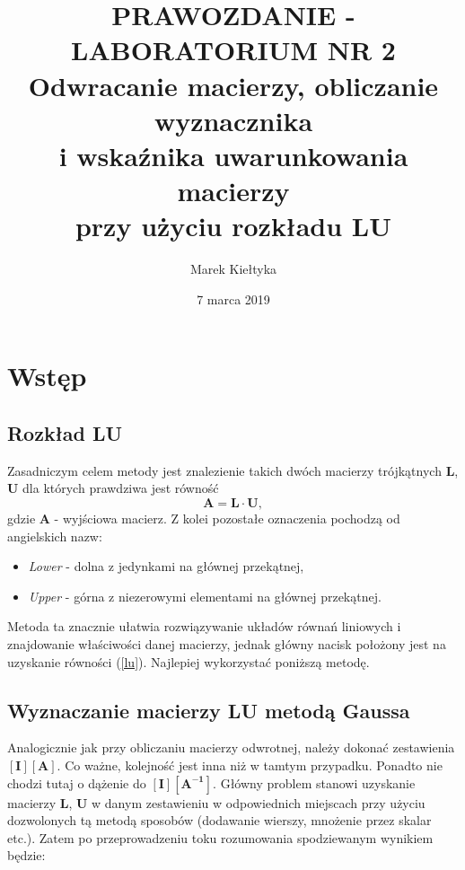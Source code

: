 

\title{\Large\vspace{-2.5cm}{\Huge S}PRAWOZDANIE - LABORATORIUM NR {\Huge2}\\
		\textbf{Odwracanie macierzy, obliczanie wyznacznika \\i wskaźnika uwarunkowania macierzy \\przy użyciu rozkładu LU } } 
\date{\Large7 marca 2019}
\author{\Large Marek Kiełtyka}


\maketitle

\section{Wstęp}
	
\subsection{Rozkład LU}

Zasadniczym celem metody jest znalezienie takich dwóch macierzy trójkątnych \textbf{L}, \textbf{U} dla których prawdziwa jest równość
\begin{equation}
\boldsymbol{A = L \cdot U},
\label{lu}
\end{equation}
gdzie \textbf{A} - wyjściowa macierz. Z kolei pozostałe oznaczenia pochodzą od angielskich nazw:
\begin{itemize}
	\item \textit{Lower} - dolna z jedynkami na głównej przekątnej,
	\item \textit{Upper} - górna z niezerowymi elementami na głównej przekątnej.
\end{itemize}
 Metoda ta znacznie ułatwia rozwiązywanie układów równań liniowych i znajdowanie właściwości danej macierzy, jednak główny nacisk położony jest na uzyskanie równości (\ref{lu}). Najlepiej wykorzystać poniższą metodę.

\subsection{Wyznaczanie macierzy LU metodą Gaussa}

Analogicznie jak przy obliczaniu macierzy odwrotnej, należy dokonać zestawienia $ \left[\boldsymbol{I}\right]\left[\boldsymbol{A}\right] $. Co ważne, kolejność jest inna niż w tamtym przypadku. 
Ponadto nie chodzi tutaj o dążenie do $ \left[\boldsymbol{I}\right]\left[\boldsymbol{A^{-1}}\right]. $
Główny problem stanowi uzyskanie macierzy \textbf{L}, \textbf{U} w danym zestawieniu w odpowiednich miejscach przy użyciu dozwolonych tą metodą sposobów (dodawanie wierszy, mnożenie przez skalar etc.). Zatem po przeprowadzeniu toku rozumowania spodziewanym wynikiem będzie:

